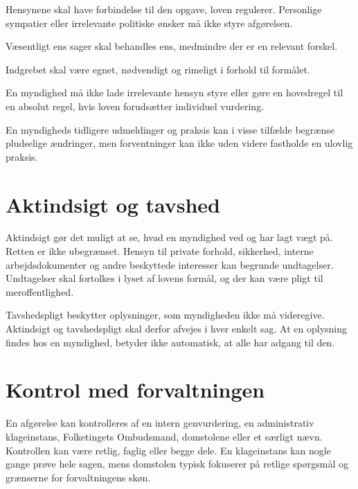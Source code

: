 \begin{description}[style=nextline,leftmargin=0pt,labelindent=0pt]
  \item[Saglighed] Hensynene skal have forbindelse til den opgave, loven regulerer. Personlige sympatier eller irrelevante politiske ønsker må ikke styre afgørelsen.
  \item[Lighed] Væsentligt ens sager skal behandles ens, medmindre der er en relevant forskel.
  \item[Proportionalitet] Indgrebet skal være egnet, nødvendigt og rimeligt i forhold til formålet.
  \item[Magtfordrejning og skønsgrænser] En myndighed må ikke lade irrelevante hensyn styre eller gøre en hovedregel til en absolut regel, hvis loven forudsætter individuel vurdering.
  \item[Berettigede forventninger] En myndigheds tidligere udmeldinger og praksis kan i visse tilfælde begrænse pludselige ændringer, men forventninger kan ikke uden videre fastholde en ulovlig praksis.
\end{description}

\section{Aktindsigt og tavshed}

Aktindsigt gør det muligt at se, hvad en myndighed ved og har lagt vægt på. Retten er ikke ubegrænset. Hensyn til private forhold, sikkerhed, interne arbejdsdokumenter og andre beskyttede interesser kan begrunde undtagelser. Undtagelser skal fortolkes i lyset af lovens formål, og der kan være pligt til meroffentlighed.

Tavshedspligt beskytter oplysninger, som myndigheden ikke må videregive. Aktindsigt og tavshedspligt skal derfor afvejes i hver enkelt sag. At en oplysning findes hos en myndighed, betyder ikke automatisk, at alle har adgang til den.

\section{Kontrol med forvaltningen}

En afgørelse kan kontrolleres af en intern genvurdering, en administrativ klageinstans, Folketingets Ombudsmand, domstolene eller et særligt nævn. Kontrollen kan være retlig, faglig eller begge dele. En klageinstans kan nogle gange prøve hele sagen, mens domstolen typisk fokuserer på retlige spørgsmål og grænserne for forvaltningens skøn.

